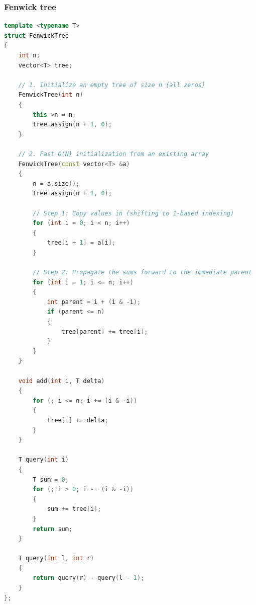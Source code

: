 \documentclass[10pt,landscape,a4paper,twocolumn]{article}
\begin{document}
\subsubsection{Fenwick tree}
\begin{lstlisting}[language=C++]
template <typename T>
struct FenwickTree
{
    int n;
    vector<T> tree;

    // 1. Initialize an empty tree of size n (all zeros)
    FenwickTree(int n)
    {
        this->n = n;
        tree.assign(n + 1, 0);
    }

    // 2. Fast O(N) initialization from an existing array
    FenwickTree(const vector<T> &a)
    {
        n = a.size();
        tree.assign(n + 1, 0);

        // Step 1: Copy values in (shifting to 1-based indexing)
        for (int i = 0; i < n; i++)
        {
            tree[i + 1] = a[i];
        }

        // Step 2: Propagate the sums forward to the immediate parent
        for (int i = 1; i <= n; i++)
        {
            int parent = i + (i & -i);
            if (parent <= n)
            {
                tree[parent] += tree[i];
            }
        }
    }

    void add(int i, T delta)
    {
        for (; i <= n; i += (i & -i))
        {
            tree[i] += delta;
        }
    }

    T query(int i)
    {
        T sum = 0;
        for (; i > 0; i -= (i & -i))
        {
            sum += tree[i];
        }
        return sum;
    }

    T query(int l, int r)
    {
        return query(r) - query(l - 1);
    }
};

\end{lstlisting}
\end{document}
